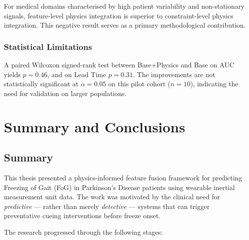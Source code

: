 \documentclass[12pt,a4paper,oneside]{report}
\numberwithin{equation}{chapter}
\numberwithin{figure}{chapter}
\numberwithin{table}{chapter}
\begin{document}
For medical domains characterised by high patient variability and non-stationary signals, feature-level physics integration is superior to constraint-level physics integration. This negative result serves as a primary methodological contribution.

\subsection{Statistical Limitations}

A paired Wilcoxon signed-rank test between Base+Physics and Base on AUC yields $p = 0.46$, and on Lead Time $p = 0.31$. The improvements are not statistically significant at $\alpha = 0.05$ on this pilot cohort ($n = 10$), indicating the need for validation on larger populations.


\chapter{Summary and Conclusions}

\section{Summary}

This thesis presented a physics-informed feature fusion framework for predicting Freezing of Gait (FoG) in Parkinson's Disease patients using wearable inertial measurement unit data. The work was motivated by the clinical need for \textit{predictive} --- rather than merely \textit{detective} --- systems that can trigger preventative cueing interventions before freeze onset.

The research progressed through the following stages:
\end{document}
